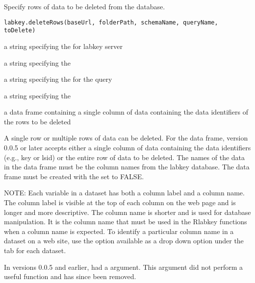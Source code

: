 \documentclass{book}
\begin{document}
\begin{Description}\relax
Specify rows of data to be deleted from the database.
\end{Description}
\begin{Usage}
\begin{verbatim}
labkey.deleteRows(baseUrl, folderPath, schemaName, queryName, toDelete) 
\end{verbatim}
\end{Usage}
\begin{Arguments}
\begin{ldescription}
\item[\code{baseUrl}] a string specifying the for labkey server
\item[\code{folderPath}] a string specifying the 
\item[\code{schemaName}] a string specifying the   for the query
\item[\code{queryName}] a string specifying the  
\item[\code{toDelete}] a data frame containing a single column of data containing the data identifiers of the rows to be deleted
\end{ldescription}
\end{Arguments}
\begin{Details}\relax
A single row or multiple rows of data can be deleted.  For the  data frame, version 0.0.5 or later accepts either a single column 
of data containing the data identifiers  (e.g., key or lsid) or the entire row of data to be deleted.
The names of the data in the data frame must be the column names from the labkey database.
The data frame must be created with the  set to FALSE.

NOTE: Each variable in a dataset has both a column label and a column name. The column label is visible at the top
of each column on the web page and is longer and more descriptive. The column name is shorter and is 
used  for database manipulation. It is the column name that must be used in
the Rlabkey functions when a column name is expected. To identify a particular column name in a dataset on
a web site, use the  option available as a drop down option under the  
tab for each dataset.

In versions 0.0.5 and earlier,  had a  argument. This argument did not perform a useful function and has since been removed.
\end{Details}
\end{document}
